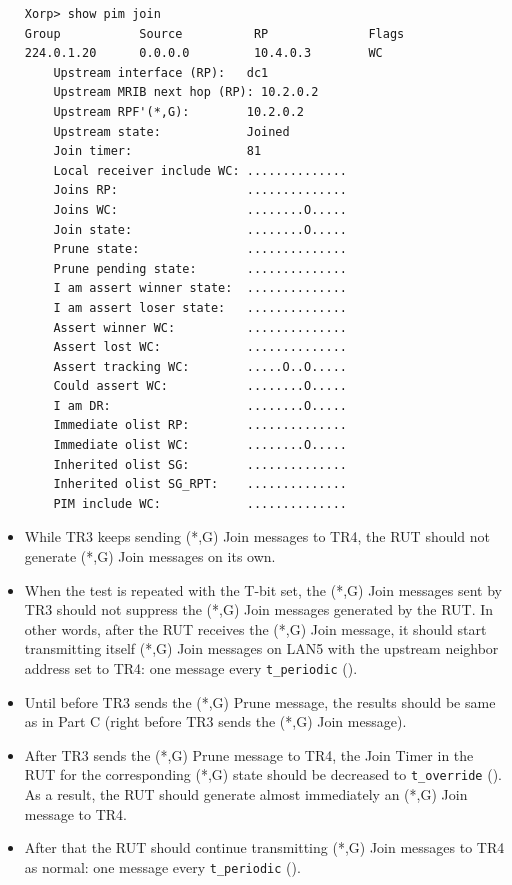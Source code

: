 \documentclass[11pt]{report}
\begin{document}
\begin{itemize}
\begin{verbatim}
Xorp> show pim join 
Group           Source          RP              Flags
224.0.1.20      0.0.0.0         10.4.0.3        WC   
    Upstream interface (RP):   dc1
    Upstream MRIB next hop (RP): 10.2.0.2
    Upstream RPF'(*,G):        10.2.0.2
    Upstream state:            Joined 
    Join timer:                81
    Local receiver include WC: ..............
    Joins RP:                  ..............
    Joins WC:                  ........O.....
    Join state:                ........O.....
    Prune state:               ..............
    Prune pending state:       ..............
    I am assert winner state:  ..............
    I am assert loser state:   ..............
    Assert winner WC:          ..............
    Assert lost WC:            ..............
    Assert tracking WC:        .....O..O.....
    Could assert WC:           ........O.....
    I am DR:                   ........O.....
    Immediate olist RP:        ..............
    Immediate olist WC:        ........O.....
    Inherited olist SG:        ..............
    Inherited olist SG_RPT:    ..............
    PIM include WC:            ..............
\end{verbatim}

  \item While TR3 keeps sending (*,G) Join messages to TR4, the RUT should
  not generate (*,G) Join messages on its own.

  \item When the test is repeated with the T-bit set, the (*,G) Join
  messages sent by TR3 should not suppress the (*,G) Join messages
  generated by the RUT. In other words, after the RUT receives the (*,G)
  Join message, it should start transmitting itself (*,G) Join messages on
  LAN5 with the upstream neighbor address set to TR4: one message every
  \verb=t_periodic= ({\PimsmTPeriodic}).

\end{itemize}


\begin{itemize}

  \item Until before TR3 sends the (*,G) Prune message, the results should
  be same as in Part C (right before TR3 sends the (*,G) Join message).

  \item After TR3 sends the (*,G) Prune message to TR4,
  the Join Timer in the RUT for the corresponding (*,G) state
  should be decreased to \verb=t_override= ({\PimsmTOverride}). As a result,
  the RUT should generate almost immediately an (*,G) Join message to TR4.

  \item After that the RUT should continue transmitting 
  (*,G) Join messages to TR4 as normal: one message every \verb=t_periodic=
  ({\PimsmTPeriodic}).

\end{itemize}
\end{document}
